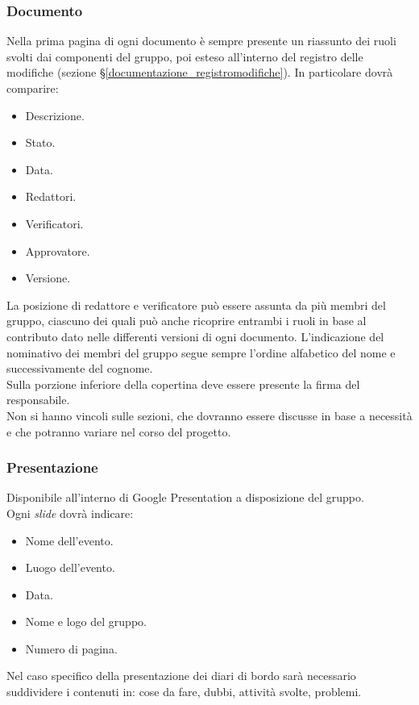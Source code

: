 \subsubsection{Documento}
Nella prima pagina di ogni documento è sempre presente un riassunto dei ruoli svolti dai componenti del gruppo, poi esteso all'interno del registro delle modifiche (sezione \S\ref{documentazione_registromodifiche}). 
In particolare dovrà comparire:
\begin{itemize}
    \item Descrizione.
    \item Stato.
    \item Data.
    \item Redattori.
    \item Verificatori.
    \item Approvatore.
    \item Versione.
\end{itemize}
La posizione di redattore e verificatore può essere assunta da più membri del gruppo, ciascuno dei quali può anche ricoprire entrambi i ruoli in base al contributo dato nelle differenti versioni di ogni documento.
L'indicazione del nominativo dei membri del gruppo segue sempre l'ordine alfabetico del nome e successivamente del cognome. \\
Sulla porzione inferiore della copertina deve essere presente la firma del responsabile. \\

\noindent
Non si hanno vincoli sulle sezioni, che dovranno essere discusse in base a necessità e che potranno variare nel corso del progetto.


\subsubsection{Presentazione}
Disponibile all'interno di Google Presentation a disposizione del gruppo. \\
Ogni \textit{slide} dovrà indicare:
\begin{itemize}
    \item Nome dell'evento.
    \item Luogo dell'evento.
    \item Data.
    \item Nome e logo del gruppo.
    \item Numero di pagina.
\end{itemize} 
Nel caso specifico della presentazione dei diari di bordo sarà necessario suddividere i contenuti in: cose da fare, dubbi, attività svolte, problemi.




